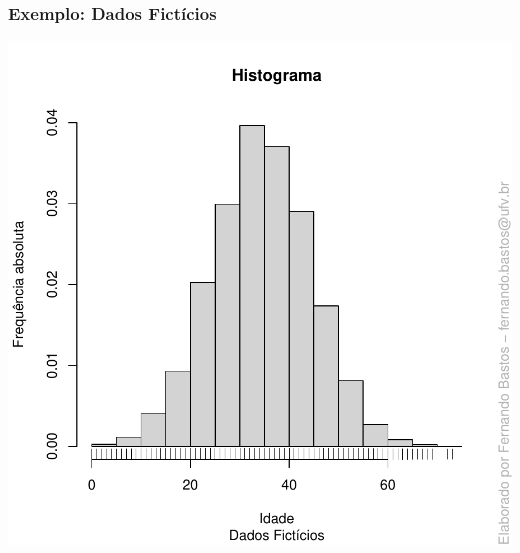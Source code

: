 \documentclass[14pt,aspectratio=1610]{beamer}
\begin{document}
\begin{frame}{}
\frametitle{Exemplo: Dados Fictícios}
\begin{block}{}
\begin{center}
\includegraphics{Aula5-idade1}
\end{center}
\end{block}
\end{frame}
\end{document}
